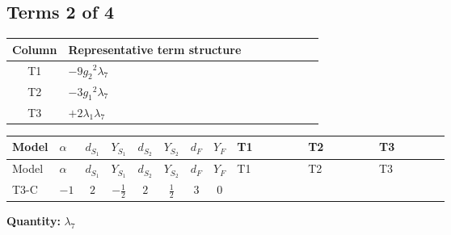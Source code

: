 \documentclass[8pt]{article}
\begin{document}
\begin{landscape}
\subsection*{Terms 2 of 4}
\begin{center}
\begin{tabular}{@{}c >{\raggedright\arraybackslash}p{0.82\linewidth}@{}}
\toprule
Column & Representative term structure \\
\midrule
T1 & \(\displaystyle -9 {g_2}^2 {\lambda_{7}}\) \\
\midrule
T2 & \(\displaystyle -3 {g_1}^2 {\lambda_{7}}\) \\
\midrule
T3 & \(\displaystyle +2 {\lambda_1} {\lambda_{7}}\) \\
\midrule
\bottomrule
\end{tabular}
\end{center}
\smallskip
\tiny
\begin{longtable}{@{}llcccccc >{\raggedright\arraybackslash}p{0.21\linewidth} >{\raggedright\arraybackslash}p{0.21\linewidth} >{\raggedright\arraybackslash}p{0.21\linewidth}@{}}
\toprule
Model & $\alpha$ & $d_{S_1}$ & $Y_{S_1}$ & $d_{S_2}$ & $Y_{S_2}$ & $d_F$ & $Y_F$ & T1 & T2 & T3 \\
\midrule
\endfirsthead
\toprule
Model & $\alpha$ & $d_{S_1}$ & $Y_{S_1}$ & $d_{S_2}$ & $Y_{S_2}$ & $d_F$ & $Y_F$ & T1 & T2 & T3 \\
\midrule
\endhead
T3-C & $-1$ & $2$ & $-\frac{1}{2}$ & $2$ & $\frac{1}{2}$ & $3$ & $0$ & \scriptsize\adjustbox{max width=\linewidth}{$\begin{gathered} -9 {g_2}^2 {\lambda_{7}}\end{gathered}$} & \scriptsize\adjustbox{max width=\linewidth}{$\begin{gathered} -3 {g_1}^2 {\lambda_{7}}\end{gathered}$} & \scriptsize\adjustbox{max width=\linewidth}{$\begin{gathered} +2 {\lambda_1} {\lambda_{7}}\end{gathered}$} \\
\midrule
\bottomrule
\end{longtable}
\clearpage
\noindent\textbf{Quantity: }$\lambda_{7}$\par\smallskip

\end{landscape}
\end{document}
